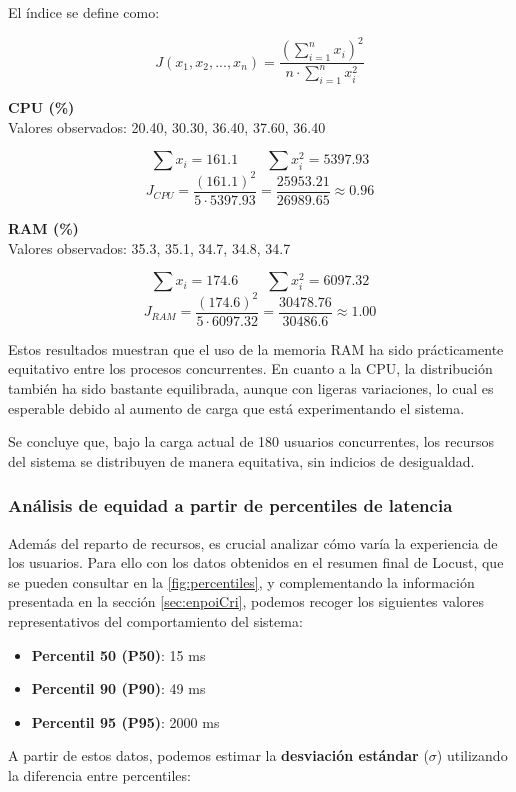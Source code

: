 \documentclass[10pt]{book}
\begin{document}
El índice se define como:

\[
J(x_1, x_2, ..., x_n) = \frac{(\sum_{i=1}^{n} x_i)^2}{n \cdot \sum_{i=1}^{n} x_i^2}
\]

\textbf{CPU (\%)}\\
Valores observados: 20.40, 30.30, 36.40, 37.60, 36.40

\[
\sum x_i = 161.1 \qquad \sum x_i^2 = 5397.93
\]
\[
J_{CPU} = \frac{(161.1)^2}{5 \cdot 5397.93} = \frac{25953.21}{26989.65} \approx 0.96
\]

\textbf{RAM (\%)}\\
Valores observados: 35.3, 35.1, 34.7, 34.8, 34.7

\[
\sum x_i = 174.6 \qquad \sum x_i^2 = 6097.32
\]
\[
J_{RAM} = \frac{(174.6)^2}{5 \cdot 6097.32} = \frac{30478.76}{30486.6} \approx 1.00
\]

Estos resultados muestran que el uso de la memoria RAM ha sido prácticamente equitativo entre los procesos concurrentes. En cuanto a la CPU, la distribución también ha sido bastante equilibrada, aunque con ligeras variaciones, lo cual es esperable debido al aumento de carga que está experimentando el sistema. 

Se concluye que, bajo la carga actual de 180 usuarios concurrentes, los recursos del sistema se distribuyen de manera equitativa, sin indicios de desigualdad.

\subsubsection*{Análisis de equidad a partir de percentiles de latencia}
Además del reparto de recursos, es crucial analizar cómo varía la experiencia de los usuarios.
Para ello con los datos obtenidos en el resumen final de Locust, que se pueden consultar en la \autoref{fig:percentiles}, y complementando la información presentada en la sección \autoref{sec:enpoiCri}, podemos recoger los siguientes valores representativos del comportamiento del sistema:

\begin{itemize}
  \item \textbf{Percentil 50 (P50)}: 15 ms
  \item \textbf{Percentil 90 (P90)}: 49 ms
  \item \textbf{Percentil 95 (P95)}: 2000 ms
\end{itemize}

A partir de estos datos, podemos estimar la \textbf{desviación estándar} (\(\sigma\)) utilizando la diferencia entre percentiles:
\end{document}
